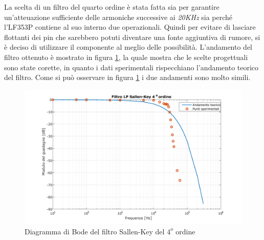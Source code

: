 \documentclass[titlepage]{report}
\begin{document}
	La scelta di un filtro del quarto ordine è stata fatta sia per garantire un'atteuazione sufficiente delle armoniche successive ai \textit{20KHz} sia perché l'LF353P contiene al suo interno due operazionali. Quindi per evitare di lasciare flottanti dei pin che sarebbero potuti diventare una fonte aggiuntiva di rumore, si è deciso di utilizzare il componente al meglio delle possibilità.
	L'andamento del filtro ottenuto è mostrato in figura \ref{fig:BODELp4Real}, la quale mostra che le scelte progettuali sono state corette, in quanto i dati sperimentali rispecchiano l'andamento teorico del filtro.
	Come si può osservare in figura \ref{fig:BODELp4Real} i due andamenti sono molto simili.
	
	\begin{figure}[h]
		\centering
		\includegraphics[scale=0.7]{Immagini/bode_lp4.pdf}
		\caption{Diagramma di Bode del filtro Sallen-Key del $4^o$ ordine}
		\label{fig:BODELp4Real}
	\end{figure}
	
	
	     

		
     	
\end{document}
